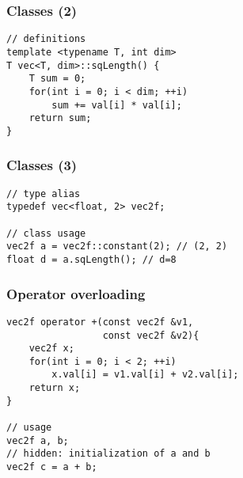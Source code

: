 \begin{frame}[fragile]
\frametitle{Classes (2)}
\begin{lstlisting}
// definitions
template <typename T, int dim>
T vec<T, dim>::sqLength() {
    T sum = 0;
    for(int i = 0; i < dim; ++i)
        sum += val[i] * val[i];
    return sum;
}
\end{lstlisting}
\end{frame}

\begin{frame}[fragile]
\frametitle{Classes (3)}
\begin{lstlisting}
// type alias
typedef vec<float, 2> vec2f;

// class usage
vec2f a = vec2f::constant(2); // (2, 2)
float d = a.sqLength(); // d=8
\end{lstlisting}
\end{frame}

\begin{frame}[fragile]
\frametitle{Operator overloading}
\begin{lstlisting}
vec2f operator +(const vec2f &v1,
                 const vec2f &v2){
    vec2f x;
    for(int i = 0; i < 2; ++i)
        x.val[i] = v1.val[i] + v2.val[i];
    return x;
}

// usage
vec2f a, b;
// hidden: initialization of a and b
vec2f c = a + b;
\end{lstlisting}
\end{frame}

